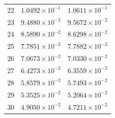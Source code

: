 \begin{table}[H]
\begin{tabular}{@{}rrr@{}}
22 & $1.0492\times10^{-1}$ & $1.0611\times10^{-1}$\\
23 & $9.4880\times10^{-2}$ & $9.5672\times10^{-2}$\\
24 & $8.5890\times10^{-2}$ & $8.6298\times10^{-2}$\\
25 & $7.7851\times10^{-2}$ & $7.7882\times10^{-2}$\\
26 & $7.0673\times10^{-2}$ & $7.0330\times10^{-2}$\\
27 & $6.4273\times10^{-2}$ & $6.3559\times10^{-2}$\\
28 & $5.8579\times10^{-2}$ & $5.7493\times10^{-2}$\\
29 & $5.3525\times10^{-2}$ & $5.2064\times10^{-2}$\\
30 & $4.9050\times10^{-2}$ & $4.7211\times10^{-2}$\\
\bottomrule
\end{tabular}
\end{table}

